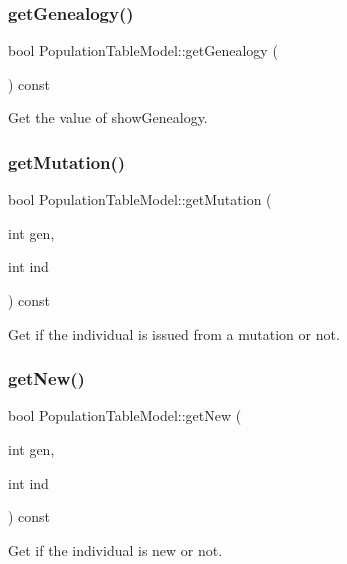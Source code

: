 \subsubsection{\texorpdfstring{get\+Genealogy()}{getGenealogy()}}
{\footnotesize\ttfamily bool Population\+Table\+Model\+::get\+Genealogy (\begin{DoxyParamCaption}{ }\end{DoxyParamCaption}) const}



Get the value of show\+Genealogy. 

\mbox{\label{class_population_table_model_aed9a2f2273e32671be1fabcf7050620f}} 
\subsubsection{\texorpdfstring{get\+Mutation()}{getMutation()}}
{\footnotesize\ttfamily bool Population\+Table\+Model\+::get\+Mutation (\begin{DoxyParamCaption}\item[{int}]{gen,  }\item[{int}]{ind }\end{DoxyParamCaption}) const}



Get if the individual is issued from a mutation or not. 

\mbox{\label{class_population_table_model_aa9c8b5f91e1da0c1e634fd01c1d2c4bf}} 
\subsubsection{\texorpdfstring{get\+New()}{getNew()}}
{\footnotesize\ttfamily bool Population\+Table\+Model\+::get\+New (\begin{DoxyParamCaption}\item[{int}]{gen,  }\item[{int}]{ind }\end{DoxyParamCaption}) const}



Get if the individual is new or not. 

